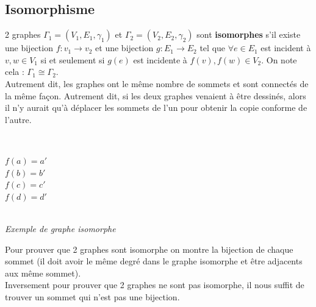 \documentclass[11pt]{article}
\begin{document}
	\subsection{Isomorphisme}
		2 graphes $\Gamma_1 = (V_1,E_1,\gamma_1)$ et $\Gamma_2 = (V_2,E_2,\gamma_2)$ sont \textbf{isomorphes} s'il existe une bijection $f : v_1 \rightarrow v_2$ et une bijection $g : E_1 \rightarrow E_2$ tel que $\forall e \in E_1$ est incident à $v, w \in V_1$ si et seulement si $g(e)$ est incidente à $f(v), f(w) \in V_2$. On note cela : $\Gamma_1 \cong \Gamma_2$. \\ %
		Autrement dit, les graphes ont le même nombre de sommets et sont connectés de la même façon. Autrement dit, si les deux graphes venaient à être dessinés, alors il n'y aurait qu'à déplacer les sommets de l'un pour obtenir la copie conforme de l'autre.\\
		\begin{center}
		\begin{minipage}{0.5\textwidth}
			 \\
			\end{minipage}\hfill
			\begin{minipage}{0.5\textwidth}
			\center
			$f(a) = a'$ \\
			$f(b) = b'$ \\
			$f(c) = c'$ \\
			$f(d) = d'$ 
			\end{minipage}\\
			\textit{Exemple de graphe isomorphe}
		\end{center}
		
		Pour prouver que 2 graphes sont isomorphe on montre la bijection de chaque sommet (il doit avoir le même degré dans le graphe isomorphe et être adjacents aux même sommet).\\ %
		Inversement pour prouver que 2 graphes ne sont pas isomorphe, il nous suffit de trouver un sommet qui n'est pas une bijection.
	
\end{document}
